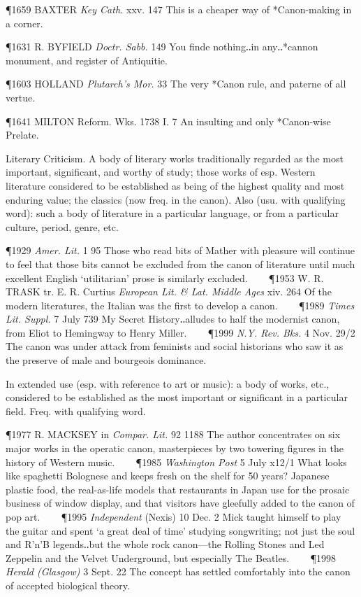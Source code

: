 \begin{description}[wide, labelwidth=!, labelindent=0pt]
\begin{myenumerate}
\P 1659 BAXTER  \textit{Key Cath.} xxv. 147 This is a cheaper way of *Canon-making in a corner.

\P 1631 R. BYFIELD  \textit{Doctr. Sabb.} 149 You finde nothing‥in any‥*cannon monument, and register of Antiquitie.

\P 1603 HOLLAND  \textit{Plutarch's Mor.} 33 The very *Canon rule, and paterne of all vertue.

\P 1641 MILTON Reform. Wks. 1738 I. 7  An insulting and only *Canon-wise Prelate.

 Literary Criticism. A body of literary works traditionally regarded as the most important, significant, and worthy of study; those works of esp. Western literature considered to be established as being of the highest quality and most enduring value; the classics (now freq. in the canon). Also (usu. with qualifying word): such a body of literature in a particular language, or from a particular culture, period, genre, etc.

\P 1929 \textit{Amer.  Lit.} 1 95 Those who read bits of Mather with pleasure will continue to feel that those bits cannot be excluded from the canon of literature until much excellent English ‘utilitarian’ prose is similarly excluded.    
\P 1953 W. R. TRASK tr. E. R. Curtius \textit{European Lit. \& Lat. Middle Ages} xiv. 264 Of the modern literatures, the Italian was the first to develop a canon.    
\P 1989  \textit{Times Lit. Suppl.} 7 July 739 My Secret History‥alludes to half the modernist canon, from Eliot to Hemingway to Henry Miller.    
\P 1999 \textit{N.Y. Rev. Bks.} 4 Nov. 29/2 The canon was under attack from feminists and social historians who saw it as the preserve of male and bourgeois dominance.

 In extended use (esp. with reference to art or music): a body of works, etc., considered to be established as the most important or significant in a particular field. Freq. with qualifying word.

\P 1977 R. MACKSEY in \textit{Compar. Lit.} 92 1188 The  author concentrates on six major works in the operatic canon, masterpieces by two towering figures in the history of Western music.    
\P 1985  \textit{Washington Post} 5 July x12/1 What looks like spaghetti Bolognese and keeps fresh on the shelf for 50 years? Japanese plastic food, the real-as-life models that restaurants in Japan use for the prosaic business of window display, and that visitors have gleefully added to the canon of pop art.    
\P 1995 \textit{Independent}  (Nexis) 10 Dec. 2 Mick taught himself to play the guitar and spent ‘a great deal of time’ studying songwriting; not just the soul and R'n'B legends‥but the whole rock canon—the Rolling Stones and Led Zeppelin and the Velvet Underground, but especially The Beatles.    
\P 1998 \textit{Herald  (Glasgow)} 3 Sept. 22 The concept has settled comfortably into the canon of accepted biological theory.
\end{myenumerate}



\end{description}
